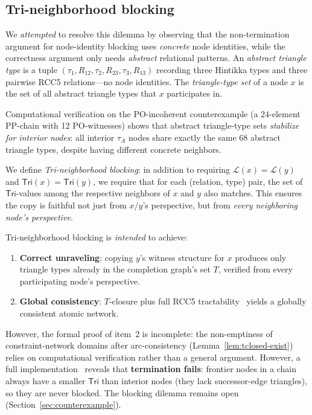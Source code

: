 \documentclass[a4paper,11pt]{article}
\theoremstyle{definition}
\newcommand{\Tri}{\ensuremath{\mathsf{Tri}}}
\newcommand{\LL}{\ensuremath{\mathcal{L}}}
\begin{document}
\subsection*{Tri-neighborhood blocking}

We \emph{attempted} to resolve this dilemma by observing that
the non-termination argument for node-identity blocking uses
\emph{concrete} node identities, while the correctness argument
only needs \emph{abstract} relational patterns.
An \emph{abstract triangle type} is a tuple
$(\tau_1, R_{12}, \tau_2, R_{23}, \tau_3, R_{13})$ recording
three Hintikka types and three pairwise RCC5 relations---no
node identities.  The \emph{triangle-type set} of a node $x$
is the set of all abstract triangle types that $x$ participates
in.

Computational verification on the PO-incoherent counterexample
(a 24-element PP-chain with 12 PO-witnesses) shows that abstract
triangle-type sets \emph{stabilize for interior nodes}: all
interior $\tau_A$ nodes share exactly the same 68 abstract
triangle types, despite having different concrete neighbors.

We define \emph{Tri-neighborhood blocking}:
in addition to requiring $\LL(x) = \LL(y)$ and
$\Tri(x) = \Tri(y)$, we require that for each
(relation, type) pair, the set of $\Tri$-values among
the respective neighbors of $x$ and $y$ also matches.
This ensures the copy is faithful not just from $x/y$'s
perspective, but from \emph{every neighboring node's
perspective}.

Tri-neighborhood blocking is \emph{intended} to achieve:
\begin{enumerate}[nosep]
  \item \textbf{Correct unraveling}: copying $y$'s witness
    structure for $x$ produces only triangle types already in
    the completion graph's set $T$, verified from every
    participating node's perspective.
  \item \textbf{Global consistency}: $T$-closure plus full
    RCC5 tractability~\cite{RenzNebel1999,Renz1999} yields a
    globally consistent atomic network.
\end{enumerate}
However, the formal proof of item~2 is incomplete: the
non-emptiness of constraint-network domains after
arc-consistency (Lemma~\ref{lem:tclosed-exist}) relies on
computational verification rather than a general argument.
However, a full implementation~\cite{NonTermScript} reveals
that \textbf{termination fails}: frontier nodes in a
chain always have a smaller $\Tri$ than interior nodes
(they lack successor-edge triangles), so they are never
blocked.  The blocking dilemma remains open
(Section~\ref{sec:counterexample}).
\end{document}
